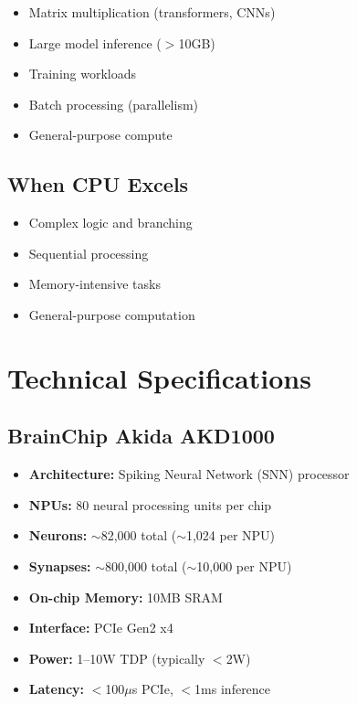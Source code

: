 \documentclass[11pt,a4paper]{article}
\begin{document}
\begin{itemize}[leftmargin=*]
    \item Matrix multiplication (transformers, CNNs)
    \item Large model inference ($>$10GB)
    \item Training workloads
    \item Batch processing (parallelism)
    \item General-purpose compute
\end{itemize}

\subsection{When CPU Excels}

\begin{itemize}[leftmargin=*]
    \item Complex logic and branching
    \item Sequential processing
    \item Memory-intensive tasks
    \item General-purpose computation
\end{itemize}

\section{Technical Specifications}

\subsection{BrainChip Akida AKD1000}

\begin{itemize}[leftmargin=*]
    \item \textbf{Architecture:} Spiking Neural Network (SNN) processor
    \item \textbf{NPUs:} 80 neural processing units per chip
    \item \textbf{Neurons:} $\sim$82,000 total ($\sim$1,024 per NPU)
    \item \textbf{Synapses:} $\sim$800,000 total ($\sim$10,000 per NPU)
    \item \textbf{On-chip Memory:} 10MB SRAM
    \item \textbf{Interface:} PCIe Gen2 x4
    \item \textbf{Power:} 1--10W TDP (typically $<$2W)
    \item \textbf{Latency:} $<$100$\mu$s PCIe, $<$1ms inference
\end{itemize}
\end{document}
